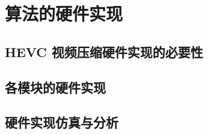 \chapter{算法的硬件实现}
\label{cha:c4}

\section{HEVC 视频压缩硬件实现的必要性}

\section{各模块的硬件实现}

\section{硬件实现仿真与分析}
